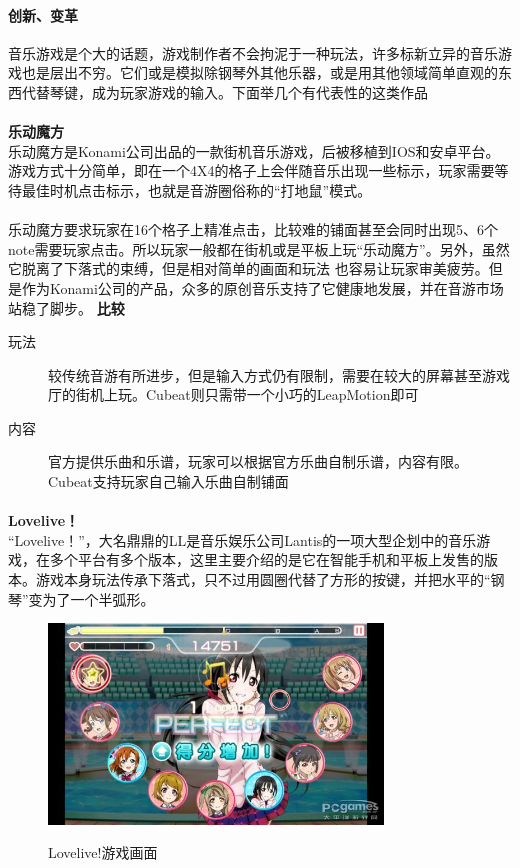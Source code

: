\documentclass{article} \usepackage{CJK}
\begin{document}
\paragraph{创新、变革}
音乐游戏是个大的话题，游戏制作者不会拘泥于一种玩法，许多标新立异的音乐游戏也是层出不穷。它们或是模拟除钢琴外其他乐器，或是用其他领域简单直观的东西代替琴键，成为玩家游戏的输入。下面举几个有代表性的这类作品
\paragraph{}
\textbf{乐动魔方}\\
乐动魔方是Konami公司出品的一款街机音乐游戏，后被移植到IOS和安卓平台。游戏方式十分简单，即在一个4X4的格子上会伴随音乐出现一些标示，玩家需要等待最佳时机点击标示，也就是音游圈俗称的“打地鼠”模式。
\paragraph{}
乐动魔方要求玩家在16个格子上精准点击，比较难的铺面甚至会同时出现5、6个note需要玩家点击。所以玩家一般都在街机或是平板上玩“乐动魔方”。另外，虽然它脱离了下落式的束缚，但是相对简单的画面和玩法
也容易让玩家审美疲劳。但是作为Konami公司的产品，众多的原创音乐支持了它健康地发展，并在音游市场站稳了脚步。
\textbf{比较}
\begin{description}
  \item[玩法] 较传统音游有所进步，但是输入方式仍有限制，需要在较大的屏幕甚至游戏厅的街机上玩。Cubeat则只需带一个小巧的LeapMotion即可
  \item[内容] 官方提供乐曲和乐谱，玩家可以根据官方乐曲自制乐谱，内容有限。Cubeat支持玩家自己输入乐曲自制铺面
\end{description}
\paragraph{}
\textbf{Lovelive！}\\
“Lovelive！”，大名鼎鼎的LL是音乐娱乐公司Lantis的一项大型企划中的音乐游戏，在多个平台有多个版本，这里主要介绍的是它在智能手机和平板上发售的版本。游戏本身玩法传承下落式，只不过用圆圈代替了方形的按键，并把水平的“钢琴”变为了一个半弧形。
\begin{figure}[H]
  \centering
  \includegraphics[width=24em]{ll.png}\\
  \caption{Lovelive!游戏画面}\label{3-3}
\end{figure}
\end{document}
